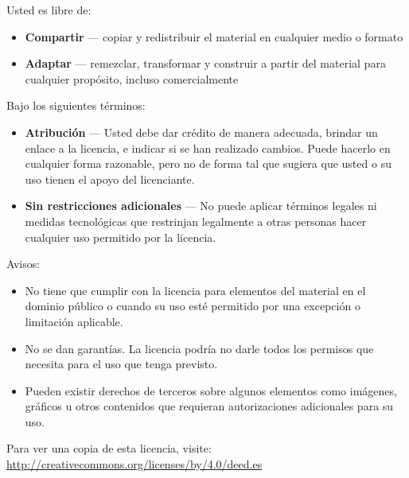 \documentclass[11pt,letterpaper]{report}
\begin{document}
Usted es libre de:
\begin{itemize}
    \item \textbf{Compartir} — copiar y redistribuir el material en cualquier medio o formato
    \item \textbf{Adaptar} — remezclar, transformar y construir a partir del material para cualquier propósito, incluso comercialmente
\end{itemize}

Bajo los siguientes términos:
\begin{itemize}
    \item \textbf{Atribución} — Usted debe dar crédito de manera adecuada, brindar un enlace a la licencia, e indicar si se han realizado cambios. Puede hacerlo en cualquier forma razonable, pero no de forma tal que sugiera que usted o su uso tienen el apoyo del licenciante.
    \item \textbf{Sin restricciones adicionales} — No puede aplicar términos legales ni medidas tecnológicas que restrinjan legalmente a otras personas hacer cualquier uso permitido por la licencia.
\end{itemize}

Avisos:
\begin{itemize}
    \item No tiene que cumplir con la licencia para elementos del material en el dominio público o cuando su uso esté permitido por una excepción o limitación aplicable.
    \item No se dan garantías. La licencia podría no darle todos los permisos que necesita para el uso que tenga previsto.
    \item Pueden existir derechos de terceros sobre algunos elementos como imágenes, gráficos u otros contenidos que requieran autorizaciones adicionales para su uso.
\end{itemize}

Para ver una copia de esta licencia, visite:\\ 
\url{http://creativecommons.org/licenses/by/4.0/deed.es}
\end{document}
